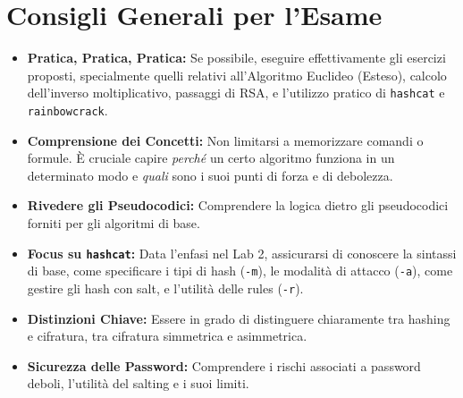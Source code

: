 \section{Consigli Generali per l'Esame}
\begin{itemize}
    \item \textbf{Pratica, Pratica, Pratica:} Se possibile, eseguire effettivamente gli esercizi proposti, specialmente quelli relativi all'Algoritmo Euclideo (Esteso), calcolo dell'inverso moltiplicativo, passaggi di RSA, e l'utilizzo pratico di \texttt{hashcat} e \texttt{rainbowcrack}.
    \item \textbf{Comprensione dei Concetti:} Non limitarsi a memorizzare comandi o formule. È cruciale capire \textit{perché} un certo algoritmo funziona in un determinato modo e \textit{quali} sono i suoi punti di forza e di debolezza.
    \item \textbf{Rivedere gli Pseudocodici:} Comprendere la logica dietro gli pseudocodici forniti per gli algoritmi di base.
    \item \textbf{Focus su \texttt{hashcat}:} Data l'enfasi nel Lab 2, assicurarsi di conoscere la sintassi di base, come specificare i tipi di hash (\texttt{-m}), le modalità di attacco (\texttt{-a}), come gestire gli hash con salt, e l'utilità delle rules (\texttt{-r}).
    \item \textbf{Distinzioni Chiave:} Essere in grado di distinguere chiaramente tra hashing e cifratura, tra cifratura simmetrica e asimmetrica.
    \item \textbf{Sicurezza delle Password:} Comprendere i rischi associati a password deboli, l'utilità del salting e i suoi limiti.
\end{itemize}

